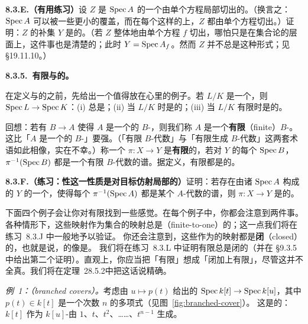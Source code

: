 \textbf{8.3.E.（有用练习）}\quad 设 $Z$ 是\trAffineScheme{} $\operatorname{Spec} A$ 的一个由单个方程局部切出的\trClosedSubset。（换言之：$\operatorname{Spec} A$ 可以被一些更小的\trOpenSet{}覆盖，而在每个这样的\trOpenSet{}上，$Z$ 都由单个方程切出。）证明：$Z$ 的补集 $Y$ 是\trAffine{}的。（若 $Z$ 整体地由单个方程 $f$ 切出，哪怕只是在集合论的层面上，这件事也是清楚的；此时 $Y=\operatorname{Spec} A_f$。然而 $Z$ 并不总是这种形式；见 \S19.11.10。）

\textbf{8.3.5.\ 有限与\trIntegral{}的\trMorphism。}

在定义\trFinite{}与\trIntegral{}的\trMorphism{}之前，先给出一个值得放在心里的例子。若 $L/K$ 是一个\trFieldExtension，则 $\operatorname{Spec} L\to\operatorname{Spec} K$：(i) 总是\trAffine；(ii) 当 $L/K$ \trAlgebraic{}时是\trIntegral{}的；(iii) 当 $L/K$ 有限时是\trFinite{}的。

回想：若有\trRingMorphism{} $B\to A$ 使得 $A$ 是一个\trFinitelyGenerated{}的 $B$-\trModule，则我们称 $A$ 是一个\textbf{有限}（finite）$B$-\trAlgebra。这比「$A$ 是一个\trFinitelyGenerated{}的 $B$-\trAlgebra」要强。（「有限 $B$-代数」与「有限生成 $B$-代数」这两套术语如此相像，实在不幸。）称一个\trMorphism{} $\pi\colon X\to Y$ 是\textbf{有限}的，若对 $Y$ 的每个\trAffine\trOpenSet{} $\operatorname{Spec} B$，$\pi^{-1}(\operatorname{Spec} B)$ 都是一个有限 $B$-代数的谱。据定义，有限\trMorphism{}都是\trAffine{}的。

\textbf{8.3.F.（练习：\trFinite{}性这一性质是对目标仿射局部的）}\quad 证明：若存在由诸\trAffine\trOpenSet{} $\operatorname{Spec} A$ 构成的 $Y$ 的一个\trCover{}，使得每个 $\pi^{-1}(\operatorname{Spec} A)$ 都是某个\trFinite{} $A$-代数的谱，则\trMorphism{} $\pi\colon X\to Y$ 是\trFinite{}的。

下面四个例子会让你对有限\trMorphism{}找到一些感觉。在每个例子中，你都会注意到两件事。各种情形下，这些映射作为集合的映射总是\trFiniteToOne{}（finite-to-one）的；这一点我们将在练习~8.3.J 中一般地予以验证。
你还会注意到，这些\trMorphism{}作为\trTopologicalSpace{}的映射都是\textbf{闭}（closed）的，也就是说，\trClosedSet{}的像是\trClosedSet。
我们将在练习~8.3.L 中证明有限\trMorphism{}总是闭的（并在 \S9.3.5 中给出第二个证明）。直观上，你应当把「有限」想成「闭加上\trFiber{}有限」，尽管这并不全真。我们将在\mbox{定理~28.5.2}中把这话说精确。

\emph{例~1：\trBranchedCover{}（branched covers）。}\quad 考虑由 $u\mapsto p(t)$ 给出的\trMorphism{} $\operatorname{Spec} k[t]\to\operatorname{Spec} k[u]$，其中 $p(t)\in k[t]$ 是一个次数 $n$ 的多项式（见图~\ref{fig:branched-cover}）。
这是\trFinite{}的：$k[t]$ 作为 $k[u]$-\trModule{}由 $1$、$t$、$t^2$、……、$t^{n-1}$ 生成。

